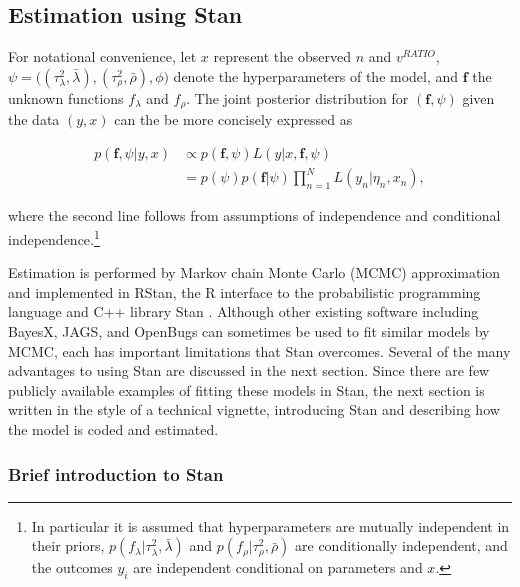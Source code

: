  \subsection{Estimation using Stan}

For notational convenience, let $x$ represent the observed $n$ and $v^{RATIO}$, $\psi = \big((\tau^2_\lambda, \bar{\lambda}), (\tau^2_\rho, \bar{\rho}), \phi \big)$ denote the hyperparameters of the model, and $\bm{f}$ the unknown functions  $f_\lambda$ and $f_\rho$. The joint posterior distribution for $(\bm{f}, \psi)$ given the data $(y, x)$ can the be more concisely expressed as 

\begin{align*}
p(\bm{f}, \psi | y, x) 
&\propto p(\bm{f}, \psi)  L(y | x, \bm{f}, \psi)  \\
&=p(\psi)  p(\bm{f} | \psi)   \prod_{n=1}^N L(y_n | \eta_n, x_n), 
\end{align*}

\noindent where the second line follows from assumptions of independence and conditional independence.\footnote{In particular it is assumed that hyperparameters are mutually independent in their priors, $p(f_\lambda | \tau^2_\lambda, \bar{\lambda})$ and $p(f_\rho | \tau^2_\rho, \bar{\rho})$ are conditionally independent, and the outcomes $y_i$ are independent conditional on parameters and $x$.}

Estimation is performed by Markov chain Monte Carlo (MCMC) approximation and implemented in RStan, the R interface to the probabilistic programming language and C++ library Stan . Although other existing software including BayesX, JAGS, and OpenBugs can sometimes be used to fit similar models by MCMC, each has important limitations that Stan overcomes. Several of the many advantages to using Stan are discussed in the next section. Since there are few publicly available examples of fitting these models in Stan, the next section is written in the style of a technical vignette, introducing Stan and describing how the model is coded and estimated. 

\subsubsection{Brief introduction to Stan}

